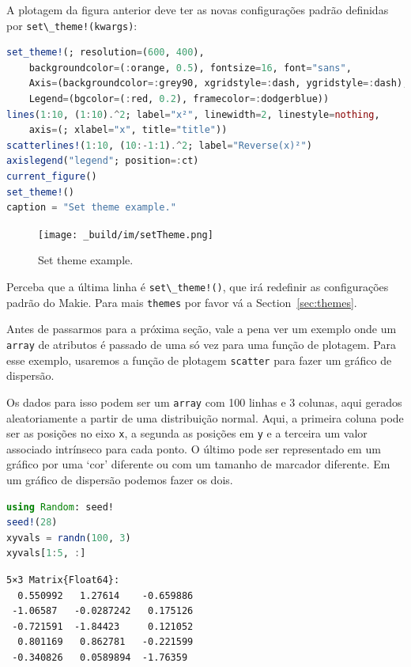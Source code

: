 \documentclass[
  notoc %
]{tufte-book}
\newcommand{\passthrough}[1]{#1}
\begin{document}
A plotagem da figura anterior deve ter as novas configurações padrão
definidas por \passthrough{\lstinline"set\_theme!(kwargs)"}:

\begin{lstlisting}[language=Julia]
set_theme!(; resolution=(600, 400),
    backgroundcolor=(:orange, 0.5), fontsize=16, font="sans",
    Axis=(backgroundcolor=:grey90, xgridstyle=:dash, ygridstyle=:dash),
    Legend=(bgcolor=(:red, 0.2), framecolor=:dodgerblue))
lines(1:10, (1:10).^2; label="x²", linewidth=2, linestyle=nothing,
    axis=(; xlabel="x", title="title"))
scatterlines!(1:10, (10:-1:1).^2; label="Reverse(x)²")
axislegend("legend"; position=:ct)
current_figure()
set_theme!()
caption = "Set theme example."
\end{lstlisting}

\begin{figure}
\hypertarget{fig:setTheme}{%
\centering
\texttt{[image: \_build/im/setTheme.png]}
\caption{Set theme example.}\label{fig:setTheme}
}
\end{figure}

Perceba que a última linha é \passthrough{\lstinline"set\_theme!()"},
que irá redefinir as configurações padrão do Makie. Para mais
\passthrough{\lstinline!themes!} por favor vá a
Section~\ref{sec:themes}.

Antes de passarmos para a próxima seção, vale a pena ver um exemplo onde
um \passthrough{\lstinline!array!} de atributos é passado de uma só vez
para uma função de plotagem. Para esse exemplo, usaremos a função de
plotagem \passthrough{\lstinline!scatter!} para fazer um gráfico de
dispersão.

Os dados para isso podem ser um \passthrough{\lstinline!array!} com 100
linhas e 3 colunas, aqui gerados aleatoriamente a partir de uma
distribuição normal. Aqui, a primeira coluna pode ser as posições no
eixo \passthrough{\lstinline!x!}, a segunda as posições em
\passthrough{\lstinline!y!} e a terceira um valor associado intrínseco
para cada ponto. O último pode ser representado em um gráfico por uma
`cor' diferente ou com um tamanho de marcador diferente. Em um gráfico
de dispersão podemos fazer os dois.

\begin{lstlisting}[language=Julia]
using Random: seed!
seed!(28)
xyvals = randn(100, 3)
xyvals[1:5, :]
\end{lstlisting}

\begin{lstlisting}[language=Output]
5×3 Matrix{Float64}:
  0.550992   1.27614    -0.659886
 -1.06587   -0.0287242   0.175126
 -0.721591  -1.84423     0.121052
  0.801169   0.862781   -0.221599
 -0.340826   0.0589894  -1.76359
\end{lstlisting}
\end{document}
